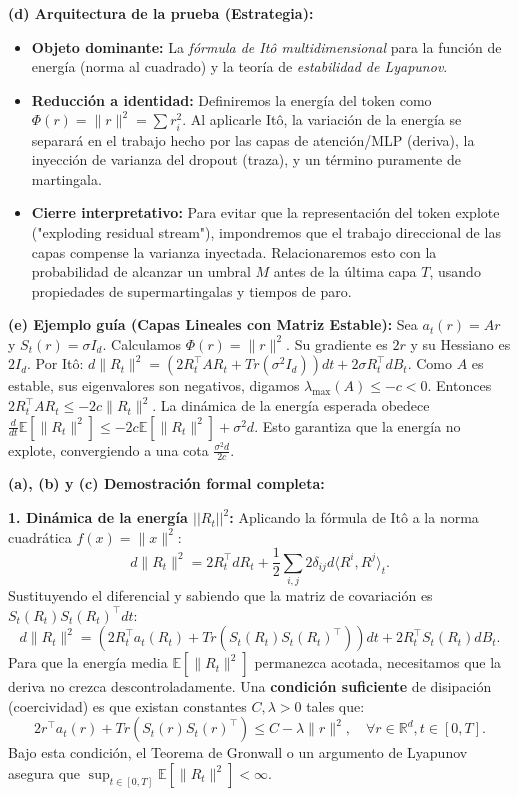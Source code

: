 \documentclass[11pt, letterpaper]{article}
\begin{document}
\begin{solucion}
    \textbf{(d) Arquitectura de la prueba (Estrategia):}
    \begin{itemize}
        \item[(i)] \textbf{Objeto dominante:} La \textit{fórmula de Itô multidimensional} para la función de energía (norma al cuadrado) y la teoría de \textit{estabilidad de Lyapunov}.
        \item[(ii)] \textbf{Reducción a identidad:} Definiremos la energía del token como $\Phi(r) = \|r\|^2 = \sum r_i^2$. Al aplicarle Itô, la variación de la energía se separará en el trabajo hecho por las capas de atención/MLP (deriva), la inyección de varianza del dropout (traza), y un término puramente de martingala.
        \item[(iii)] \textbf{Cierre interpretativo:} Para evitar que la representación del token explote ("exploding residual stream"), impondremos que el trabajo direccional de las capas compense la varianza inyectada. Relacionaremos esto con la probabilidad de alcanzar un umbral $M$ antes de la última capa $T$, usando propiedades de supermartingalas y tiempos de paro.
    \end{itemize}

    \vspace{3mm}
    \textbf{(e) Ejemplo guía (Capas Lineales con Matriz Estable):}
    Sea $a_t(r) = Ar$ y $S_t(r) = \sigma I_d$. 
    Calculamos $\Phi(r) = \|r\|^2$. Su gradiente es $2r$ y su Hessiano es $2I_d$.
    Por Itô: $d\|R_t\|^2 = \left( 2 R_t^\top A R_t + Tr(\sigma^2 I_d) \right) dt + 2\sigma R_t^\top dB_t$.
    Como $A$ es estable, sus eigenvalores son negativos, digamos $\lambda_{\max}(A) \le -c < 0$.
    Entonces $2 R_t^\top A R_t \le -2c \|R_t\|^2$. 
    La dinámica de la energía esperada obedece $\frac{d}{dt}\mathbb{E}[\|R_t\|^2] \le -2c \mathbb{E}[\|R_t\|^2] + \sigma^2 d$. Esto garantiza que la energía no explote, convergiendo a una cota $\frac{\sigma^2 d}{2c}$.

    \textbf{(a), (b) y (c) Demostración formal completa:}

    \textbf{1. Dinámica de la energía $||R_t||^2$:}
    Aplicando la fórmula de Itô a la norma cuadrática $f(x) = \|x\|^2$:
    \[ d\|R_t\|^2 = 2 R_t^\top dR_t + \frac{1}{2} \sum_{i,j} 2 \delta_{ij} d\langle R^i, R^j \rangle_t. \]
    Sustituyendo el diferencial y sabiendo que la matriz de covariación es $S_t(R_t)S_t(R_t)^\top dt$:
    \[ d\|R_t\|^2 = \left( 2 R_t^\top a_t(R_t) + Tr(S_t(R_t)S_t(R_t)^\top) \right) dt + 2 R_t^\top S_t(R_t) dB_t. \]
    Para que la energía media $\mathbb{E}[\|R_t\|^2]$ permanezca acotada, necesitamos que la deriva no crezca descontroladamente. Una \textbf{condición suficiente} de disipación (coercividad) es que existan constantes $C, \lambda > 0$ tales que:
    \[ 2 r^\top a_t(r) + Tr(S_t(r)S_t(r)^\top) \le C - \lambda \|r\|^2, \quad \forall r \in \mathbb{R}^d, t \in [0,T]. \]
    Bajo esta condición, el Teorema de Gronwall o un argumento de Lyapunov asegura que $\sup_{t \in [0,T]} \mathbb{E}[\|R_t\|^2] < \infty$.


\end{solucion}
\end{document}
